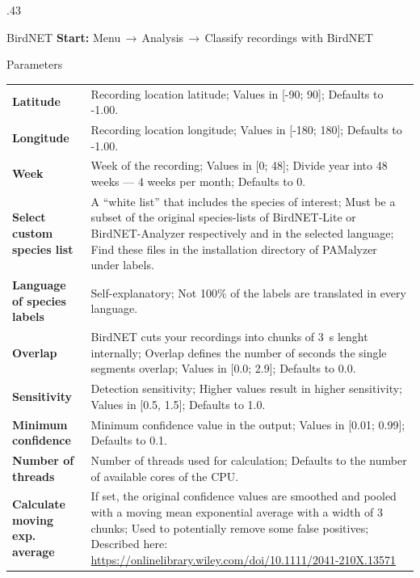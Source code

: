 \documentclass[final]{beamer}
\begin{document}
\begin{frame}[fragile]{}
\begin{columns}[t]
      \begin{column}{.43\linewidth}
	\begin{block}{BirdNET}
	\textbf{Start:} Menu$\,\to\,$Analysis$\,\to\,$Classify recordings with BirdNET\\
	\begin{subblock}{Parameters}
{\renewcommand{\arraystretch}{1.2}
	\begin{tabular}{p{7em}p{25em}}
		\textbf{Latitude} & Recording location latitude; Values in [-90; 90]; Defaults to -1.00.\\
\textbf{Longitude} & Recording location longitude; Values in [-180; 180]; Defaults to -1.00.\\
	\textbf{Week} & Week of the recording; Values in [0; 48]; Divide year into 48 weeks — 4 weeks per month; Defaults to 0.\\
\textbf{Select custom species list} & A ``white list'' that includes the species of interest; Must be a subset of the original species-lists of BirdNET-Lite or BirdNET-Analyzer respectively and in the selected language; Find these files in the installation directory of PAMalyzer under labels.\\ 
\textbf{Language of species labels} & Self-explanatory; Not 100\% of the labels are translated in every language.\\
\textbf{Overlap} & BirdNET cuts your recordings into chunks of \SI{3}{\second} lenght internally; Overlap defines the number of seconds the single segments overlap; Values in [0.0; 2.9]; Defaults to 0.0.\\
\textbf{Sensitivity} & Detection sensitivity; Higher values result in higher sensitivity; Values in [0.5, 1.5]; Defaults to 1.0.\\
\textbf{Minimum confidence} & Minimum confidence value in the output; Values in [0.01; 0.99]; Defaults to 0.1.\\
\textbf{Number of threads} & Number of threads used for calculation; Defaults to the number of available cores of the CPU.\\
\textbf{Calculate moving exp. average} & If set, the original confidence values are smoothed and pooled with a moving mean exponential average with a width of 3 chunks; Used to potentially remove some false positives; Described here: \url{https://onlinelibrary.wiley.com/doi/10.1111/2041-210X.13571}\\

\end{tabular}}
\end{subblock}
\end{block}
\end{column}
\end{columns}
\end{frame}
\end{document}
